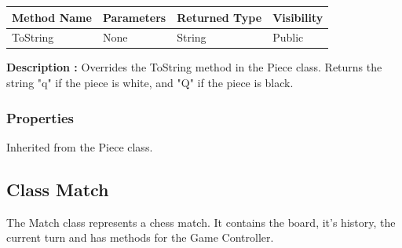 \documentclass[12pt]{article}
\begin{document}
    \begin{table}[H]
        \begin{tabular}{|l|l|l|l|}
            \hline
            \rowcolor[HTML]{EFEFEF}
            \cellcolor[HTML]{EFEFEF}\textbf{Method Name} & \textbf{Parameters} & \textbf{Returned Type} & \textbf{Visibility} \\ \hline
            ToString                                     & None                & String                 & Public              \\ \hline
        \end{tabular}
    \end{table}

    \textbf{Description :} Overrides the ToString method in the Piece class.
    Returns the string "q" if the piece is white, and "Q" if the piece is black.

    \subsubsection{Properties}

    Inherited from the Piece class.

    \newpage


    \subsection{Class Match}

    The Match class represents a chess match. It contains the board, it's history, the current turn and has methods for the Game Controller.
\end{document}
